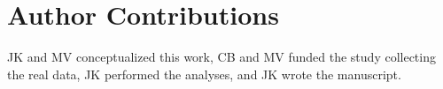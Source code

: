 \documentclass[10pt,letterpaper]{article}
\begin{document}
\section*{Author Contributions}
JK and MV conceptualized this work, CB and MV funded the study collecting the real data,
JK performed the analyses, and JK wrote the manuscript.

\nolinenumbers


%
%
% 




\end{document}

